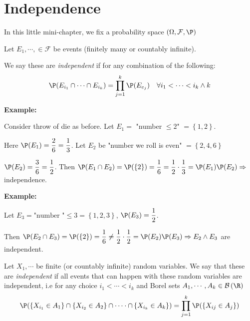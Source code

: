 \section{Independence}\par
\noindent In this little mini-chapter, we fix a probability space $(\Omega, \mathcal{F}, \P)$
\par\bigskip
\begin{defo}[Independence]{}
  Let $E_1,\cdots,\in\mathcal{F}$ be events (finitely many or countably infinite).\par
  \noindent We say these are \textit{independent} if for any combination of the following:
  \begin{equation*}
    \begin{gathered}
      \P(E_{i_1}\cap\cdots\cap E_{i_k}) = \prod_{j=1}^{k}\P(E_{e_j})\quad\forall i_1<\cdots<i_k\wedge k
    \end{gathered}
  \end{equation*}
\end{defo}
\par\bigskip
\noindent\textbf{Example:}\par
\noindent Consider throw of die as before. Let $E_1 = $ "number $\leq 2$" $=\left\{1,2\right\}$.\par
\noindent Here $\P(E_1) = \dfrac{2}{6} = \dfrac{1}{3}$. Let $E_2$ be "number we roll is even" $ = \left\{2,4,6\right\}$\par
\noindent $\P(E_2) = \dfrac{3}{6} = \dfrac{1}{2}$. Then $\P(E_1\cap E_2) = \P(\left\{2\right\}) = \dfrac{1}{6} = \dfrac{1}{2}\cdot\dfrac{1}{3} = \P(E_1)\P(E_2)\Rightarrow$ independence.
\par\bigskip
\noindent\textbf{Example:}\par
\noindent Let $E_3 = \text{"number "}\leq3 =\left\{1,2,3\right\}$, $\P(E_3) = \dfrac{1}{2}$.\par
\noindent Then $\P(E_2\cap E_3) = \P(\left\{2\right\}) = \dfrac{1}{6} \neq \dfrac{1}{2}\cdot\dfrac{1}{2}= \P(E_2)\P(E_3)\Rightarrow E_2\wedge E_3$ are independent.
\par\bigskip
\begin{defo}{}
  Let $X_1,\cdots$ be finite (or countably infinite) random variables. We say that these are \textit{independent} if all events that can happen with these random variables are independent, i.e for any choice $i_1<\cdots<i_k$ and Borel sets $A_1,\cdots, A_k\in\mathcal{B}\left(\R\right)$
  \begin{equation*}
    \begin{gathered}
      \P(\left\{X_{i_1}\in A_1\right\}\cap \left\{X_{i_2}\in A_2\right\}\cap\cdots\cdot\cap\left\{X_{i_k}\in A_k\right\}) = \prod_{j=1}^{k}\P(\left\{X_{ij}\in A_j\right\})
    \end{gathered}
  \end{equation*}
\end{defo}\par
